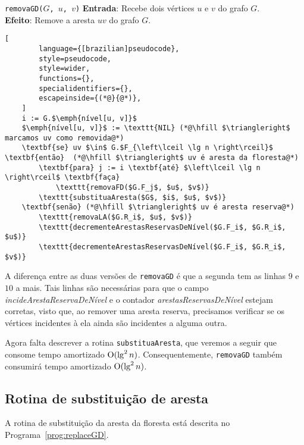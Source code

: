 \begin{programruledcaption}{\texttt{removaGD($G$, $u$, $v$)} \label{prog:removeGD-version2}}
    \noindent\textbf{Entrada}: Recebe dois vértices $u$ e $v$ do grafo $G$. \\
    \noindent\textbf{Efeito}: Remove a aresta $uv$ do grafo $G$. 
    \vspace{-0.5\baselineskip}
    \begin{lstlisting}[
        language={[brazilian]pseudocode},
        style=pseudocode,
        style=wider,
        functions={},
        specialidentifiers={},
        escapeinside={(*@}{@*)},
    ]
    i := G.$\emph{nível[u, v]}$
    $\emph{nível[u, v]}$ := \texttt{NIL} (*@\hfill $\triangleright$ marcamos uv como removida@*)
    \textbf{se} uv $\in$ G.$F_{\left\lceil \lg n \right\rceil}$ \textbf{então}  (*@\hfill $\triangleright$ uv é aresta da floresta@*)
        \textbf{para} j := i \textbf{até} $\left\lceil \lg n \right\rceil$ \textbf{faça}
            \texttt{removaFD($G.F_j$, $u$, $v$)}
        \texttt{substituaAresta($G$, $i$, $u$, $v$)}
    \textbf{senão} (*@\hfill $\triangleright$ uv é aresta reserva@*)
        \texttt{removaLA($G.R_i$, $u$, $v$)}
        \texttt{decrementeArestasReservasDeNível($G.F_i$, $G.R_i$, $u$)}
        \texttt{decrementeArestasReservasDeNível($G.F_i$, $G.R_i$, $v$)}
    \end{lstlisting}
    \vspace{-0.5\baselineskip}
\end{programruledcaption}

A diferença entre as duas versões de \texttt{removaGD} é que a segunda tem as linhas $9$ e $10$ a mais. Tais linhas são necessárias para que o campo \textit{incideArestaReservaDeNível} e o contador \textit{arestasReservasDeNível} estejam corretas, visto que, ao remover uma aresta reserva, precisamos verificar se os vértices incidentes à ela ainda são incidentes a alguma outra. 

Agora falta descrever a rotina \texttt{substituaAresta}, que veremos a seguir que consome tempo amortizado $\mathrm{O}(\lg^2 n)$. Consequentemente, \texttt{removaGD} também consumirá tempo amortizado $\mathrm{O}(\lg^2 n)$.

\subsection{Rotina de substituição de aresta}
\label{sec:replace-edge}

A rotina de substituição da aresta da floresta está descrita no Programa~\ref{prog:replaceGD}.

